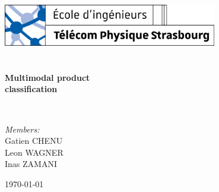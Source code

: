 \begin{titlepage}
	\begin{center}

		\includegraphics[width=0.7\textwidth]{images/Logo_Télécom_Physique_Strasbourg.png}~\\[1.5cm]


		\textsc{\Large }\\[0.5cm]

		\HRule \\[0.4cm]

		{\huge \bfseries Multimodal product\\
		classification\\[0.4cm] }

		\HRule \\[7cm]

		\begin{minipage}{0.4\textwidth}
			\begin{flushleft} \large
				\emph{Members:}\\
				Gatien \textsc{CHENU}\\
				Leon \textsc{WAGNER}\\
				Inas \textsc{ZAMANI}
			\end{flushleft}
		\end{minipage}


		\vfill

		{\large \today}

	\end{center}
\end{titlepage}